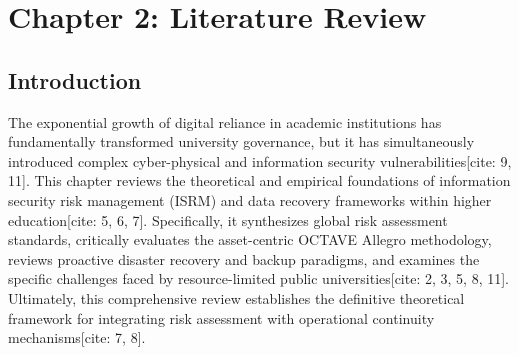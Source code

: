\documentclass[journal,onecolumn,12pt,twoside]{IEEEtran}
\begin{document}
	
	\newpage
	\section{Chapter 2: Literature Review}
	\label{sec:literature_review}
	
	\subsection{Introduction}
	\label{subsec:lit_intro}
	The exponential growth of digital reliance in academic institutions has fundamentally transformed university governance, but it has simultaneously introduced complex cyber-physical and information security vulnerabilities[cite: 9, 11]. This chapter reviews the theoretical and empirical foundations of information security risk management (ISRM) and data recovery frameworks within higher education[cite: 5, 6, 7]. Specifically, it synthesizes global risk assessment standards, critically evaluates the asset-centric OCTAVE Allegro methodology, reviews proactive disaster recovery and backup paradigms, and examines the specific challenges faced by resource-limited public universities[cite: 2, 3, 5, 8, 11]. Ultimately, this comprehensive review establishes the definitive theoretical framework for integrating risk assessment with operational continuity mechanisms[cite: 7, 8].
	
\end{document}
